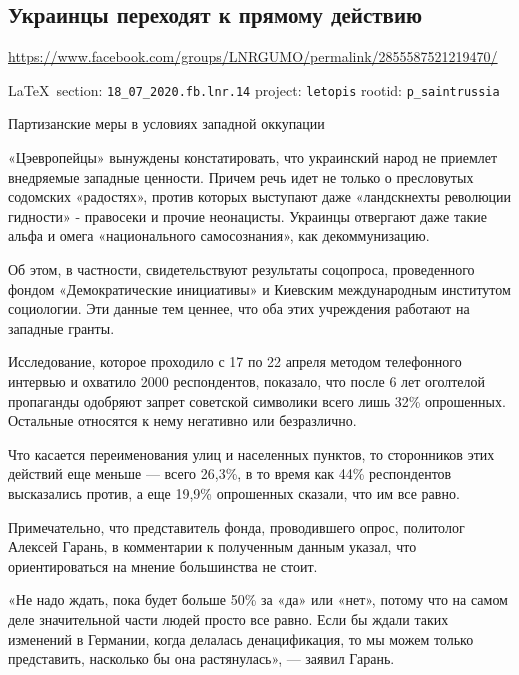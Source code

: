  
 
\subsection{Украинцы переходят к прямому действию}
\label{sec:18_07_2020.fb.lnr.14}
\url{https://www.facebook.com/groups/LNRGUMO/permalink/2855587521219470/}
  
\vspace{0.5cm}
{\small\LaTeX~section: \verb|18_07_2020.fb.lnr.14| project: \verb|letopis| rootid: \verb|p_saintrussia|}
\vspace{0.5cm}
  
Партизанские меры в условиях западной оккупации

«Цэевропейцы» вынуждены констатировать, что украинский народ не приемлет
внедряемые западные ценности. Причем речь идет не только о пресловутых
содомских «радостях», против которых выступают даже «ландскнехты революции
гидности» - правосеки и прочие неонацисты. Украинцы отвергают даже такие альфа
и омега «национального самосознания», как декоммунизацию.

Об этом, в частности, свидетельствуют результаты соцопроса, проведенного фондом
«Демократические инициативы» и Киевским международным институтом социологии.
Эти данные тем ценнее, что оба этих учреждения работают на западные гранты.

Исследование, которое проходило с 17 по 22 апреля методом телефонного интервью
и охватило 2000 респондентов, показало, что после 6 лет оголтелой пропаганды
одобряют запрет советской символики всего лишь 32\% опрошенных. Остальные
относятся к нему негативно или безразлично.

Что касается переименования улиц и населенных пунктов, то сторонников этих
действий еще меньше --- всего 26,3\%, в то время как 44\% респондентов
высказались против, а еще 19,9\% опрошенных сказали, что им все равно.

Примечательно, что представитель фонда, проводившего опрос, политолог Алексей
Гарань, в комментарии к полученным данным указал, что ориентироваться на мнение
большинства не стоит.

«Не надо ждать, пока будет больше 50\% за «да» или «нет», потому что на самом
деле значительной части людей просто все равно. Если бы ждали таких изменений в
Германии, когда делалась денацификация, то мы можем только представить,
насколько бы она растянулась», --- заявил Гарань.

